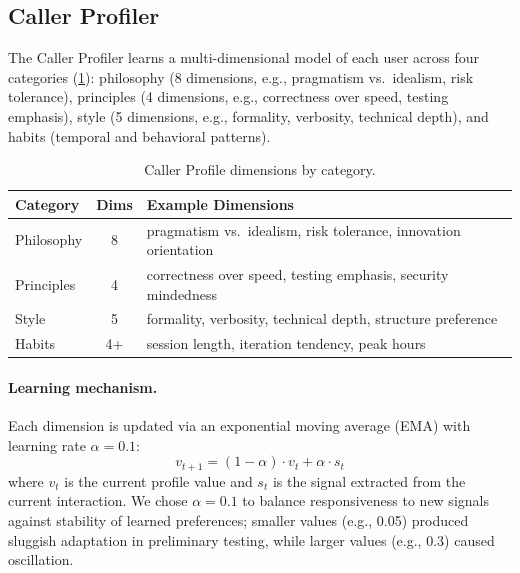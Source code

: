 \documentclass{article}
\begin{document}
\subsection{Caller Profiler}

The Caller Profiler learns a multi-dimensional model of each user across four categories (\cref{tab:profile}): philosophy (8 dimensions, e.g., pragmatism vs.\ idealism, risk tolerance), principles (4 dimensions, e.g., correctness over speed, testing emphasis), style (5 dimensions, e.g., formality, verbosity, technical depth), and habits (temporal and behavioral patterns).

\begin{table}[t]
  \caption{Caller Profile dimensions by category.}
  \label{tab:profile}
  \begin{center}
    \begin{small}
      \begin{tabular}{lcp{3.4cm}}
        \toprule
        Category & Dims & Example Dimensions \\
        \midrule
        Philosophy & 8 & pragmatism vs.\ idealism, risk tolerance, innovation orientation \\
        Principles & 4 & correctness over speed, testing emphasis, security mindedness \\
        Style & 5 & formality, verbosity, technical depth, structure preference \\
        Habits & 4+ & session length, iteration tendency, peak hours \\
        \bottomrule
      \end{tabular}
    \end{small}
  \end{center}
  \vskip -0.1in
\end{table}

\paragraph{Learning mechanism.}
Each dimension is updated via an exponential moving average (EMA) with learning rate $\alpha = 0.1$:
\begin{equation}
  v_{t+1} = (1 - \alpha) \cdot v_t + \alpha \cdot s_t
\label{eq:ema}
\end{equation}
where $v_t$ is the current profile value and $s_t$ is the signal extracted from the current interaction. We chose $\alpha = 0.1$ to balance responsiveness to new signals against stability of learned preferences; smaller values (e.g., 0.05) produced sluggish adaptation in preliminary testing, while larger values (e.g., 0.3) caused oscillation.
\end{document}
